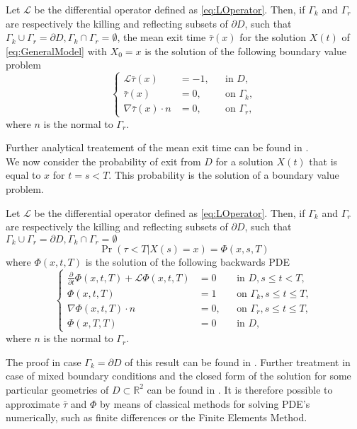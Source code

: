 \begin{theorem} Let $\mathcal L$ be the differential operator defined as \eqref{eq:LOperator}. Then, if $\Gamma_k$ and $\Gamma_r$ are respectively the killing and reflecting subsets of $\partial D$, such that $\Gamma_k \cup \Gamma_r = \partial D, \Gamma_k \cap \Gamma_r = \emptyset$, the mean exit time $\bar \tau(x)$ for the solution $X(t)$ of \eqref{eq:GeneralModel} with $X_0 = x$ is the solution of the following boundary value problem
\begin{equation}\label{eq:PDETau}
\left \{
\begin{aligned}
	\mathcal L \bar \tau(x) &= -1, && \text{in } D, \\
	\bar\tau(x) &= 0, && \text{on } \Gamma_k, \\
	\nabla \bar\tau(x) \cdot n &= 0, && \text{on } \Gamma_r,
\end{aligned} \right .
\end{equation}
where $n$ is the normal to $\Gamma_r$.
\end{theorem}
Further analytical treatement of the mean exit time can be found in \cite{Krumscheid2015,Pavliotis2014}. \\
We now consider the probability of exit from $D$ for a solution $X(t)$ that is equal to $x$ for $t = s < T$. This probability is the solution of a boundary value problem.
\begin{theorem} Let $\mathcal L$ be the differential operator defined as \eqref{eq:LOperator}. Then, if $\Gamma_k$ and $\Gamma_r$ are respectively the killing and reflecting subsets of $\partial D$, such that $\Gamma_k \cup \Gamma_r = \partial D, \Gamma_k \cap \Gamma_r = \emptyset$
\begin{equation}\label{eq:ExitProbNotation}
	\Pr(\tau < T | X(s) = x) = \Phi(x,s,T) 
\end{equation}
where $\Phi(x,t,T)$ is the solution of the following backwards PDE
\begin{equation}\label{eq:PDEPhi}
\left \{
\begin{aligned}
	\frac{\partial}{\partial t} \Phi(x,t,T) + \mathcal L \Phi(x,t,T) &= 0 && \text{in } D, s \leq t < T, \\
	\Phi(x,t,T) &= 1 && \text{on } \Gamma_k, s \leq t \leq T,\\
	\nabla \Phi(x,t,T) \cdot n &= 0, && \text{on } \Gamma_r, s \leq t \leq T, \\
	\Phi(x,T,T) &= 0 && \text{in } D,
\end{aligned} \right .
\end{equation}
where $n$ is the normal to $\Gamma_r$.
\end{theorem}
The proof in case $\Gamma_k = \partial D$ of this result can be found in \cite{Sirovich2010}. Further treatment in case of mixed boundary conditions and the closed form of the solution for some particular geometries of $D \subset \mathbb{R}^2$ can be found in \cite{Grebenkov2014}. It is therefore possible to approximate $\bar\tau$ and $\Phi$ by means of classical methods for solving PDE's numerically, such as finite differences or the Finite Elements Method.

